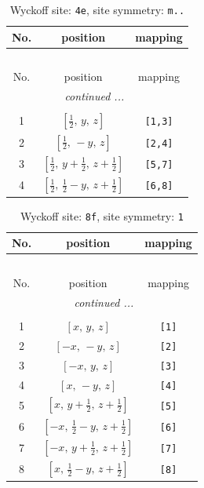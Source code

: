 \documentclass[fleqn,8pt]{jsarticle}
\begin{document}
\renewcommand{\arraystretch}{1.2}
\begin{longtable}{ccc}
\caption{Wyckoff site: {\tt 4e}, site symmetry: {\tt m..}}
 \\
 \hline \hline
No. & position & mapping \\ \hline \endfirsthead

\multicolumn{2}{l}{\tablename\ \thetable{}} \\
 \hline \hline
No. & position & mapping \\ \hline \endhead

 \hline \hline
\multicolumn{2}{r}{\footnotesize\it continued ...} \\ \endfoot

 \hline \hline
\multicolumn{2}{r}{} \\ \endlastfoot

1 & $\left[ \frac{1}{2},\, y,\, z \right]$ & {\tt [1,3]} \\ \hline
2 & $\left[ \frac{1}{2},\, - y,\, z \right]$ & {\tt [2,4]} \\ \hline
3 & $\left[ \frac{1}{2},\, y + \frac{1}{2},\, z + \frac{1}{2} \right]$ & {\tt [5,7]} \\ \hline
4 & $\left[ \frac{1}{2},\, \frac{1}{2} - y,\, z + \frac{1}{2} \right]$ & {\tt [6,8]} \\
\end{longtable}
\renewcommand{\arraystretch}{1.2}
\begin{longtable}{ccc}
\caption{Wyckoff site: {\tt 8f}, site symmetry: {\tt 1}}
 \\
 \hline \hline
No. & position & mapping \\ \hline \endfirsthead

\multicolumn{2}{l}{\tablename\ \thetable{}} \\
 \hline \hline
No. & position & mapping \\ \hline \endhead

 \hline \hline
\multicolumn{2}{r}{\footnotesize\it continued ...} \\ \endfoot

 \hline \hline
\multicolumn{2}{r}{} \\ \endlastfoot

1 & $\left[ x,\, y,\, z \right]$ & {\tt [1]} \\ \hline
2 & $\left[ - x,\, - y,\, z \right]$ & {\tt [2]} \\ \hline
3 & $\left[ - x,\, y,\, z \right]$ & {\tt [3]} \\ \hline
4 & $\left[ x,\, - y,\, z \right]$ & {\tt [4]} \\ \hline
5 & $\left[ x,\, y + \frac{1}{2},\, z + \frac{1}{2} \right]$ & {\tt [5]} \\ \hline
6 & $\left[ - x,\, \frac{1}{2} - y,\, z + \frac{1}{2} \right]$ & {\tt [6]} \\ \hline
7 & $\left[ - x,\, y + \frac{1}{2},\, z + \frac{1}{2} \right]$ & {\tt [7]} \\ \hline
8 & $\left[ x,\, \frac{1}{2} - y,\, z + \frac{1}{2} \right]$ & {\tt [8]} \\
\end{longtable}
\end{document}
